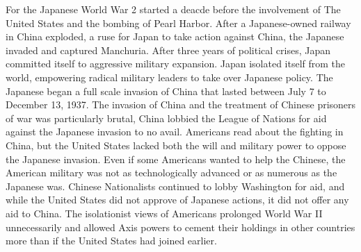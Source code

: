 For the Japanese World War 2 started a deacde before the involvement of The United States and the bombing of Pearl Harbor.
After a Japanese-owned railway in China exploded, a ruse for Japan to take action against China, the Japanese invaded and captured Manchuria.
After three years of political crises, Japan committed itself to aggressive military expansion.
Japan isolated itself from the world, empowering radical military leaders to take over Japanese policy.
The Japanese began a full scale invasion of China that lasted between July 7 to December 13, 1937.
The invasion of China and the treatment of Chinese prisoners of war was particularly brutal, China lobbied the League of Nations for aid against the Japanese invasion to no avail.
Americans read about the fighting in China, but the United States lacked both the will and military power to oppose the Japanese invasion.
Even if some Americans wanted to help the Chinese, the American military was not as technologically advanced or as numerous as the Japanese was.
Chinese Nationalists continued to lobby Washington for aid, and while the United States did not approve of Japanese actions, it did not offer any aid to China.
The isolationist views of Americans prolonged World War II unnecessarily and allowed Axis powers to cement their holdings in other countries more than if the United States had joined earlier.
